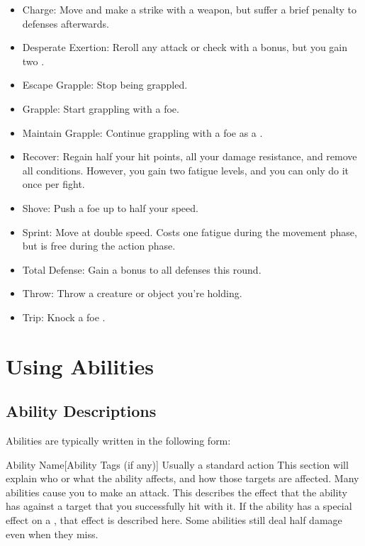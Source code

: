   \begin{itemize}
    \item Charge: Move and make a strike with a weapon, but suffer a brief  penalty to defenses afterwards.
    \item Desperate Exertion: Reroll any attack or check with a  bonus, but you gain two .
    \item Escape Grapple: Stop being grappled.
    \item Grapple: Start grappling with a foe.
    \item Maintain Grapple: Continue grappling with a foe as a .
    \item Recover: Regain half your hit points, all your damage resistance, and remove all conditions. However, you gain two fatigue levels, and you can only do it once per fight.
    \item Shove: Push a foe up to half your speed.
    \item Sprint: Move at double speed. Costs one fatigue during the movement phase, but is free during the action phase.
    \item Total Defense: Gain a  bonus to all defenses this round.
    \item Throw: Throw a creature or object you're holding.
    \item Trip: Knock a foe \prone.
  \end{itemize}

\section{Using Abilities}\label{Using Abilities}

  \subsection{Ability Descriptions}
    Abilities are typically written in the following form:
    \begin{activeability}{Ability Name}[Ability Tags (if any)]
      \abilityusagetime Usually a standard action
      \rankline
      This section will explain who or what the ability affects, and how those targets are affected.
      Many abilities cause you to make an attack.
      \hit This describes the effect that the ability has against a target that you successfully hit with it.
      \crit If the ability has a special effect on a , that effect is described here.
      \miss Some abilities still deal half damage even when they miss.
    \end{activeability}

